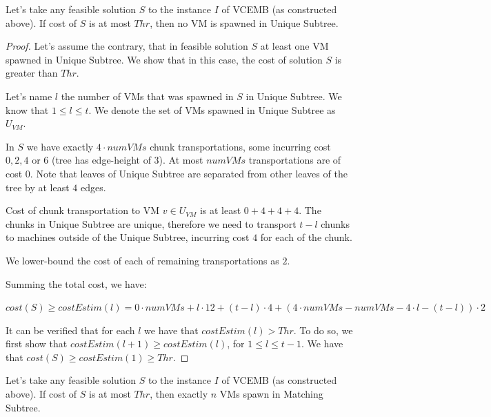 \begin{theorem}
  Let's take any feasible solution $S$ to the instance $I$ of VCEMB
  (as constructed above). If cost of $S$ is at most $Thr$, then no VM
  is spawned in Unique Subtree.
  \label{th:no-unique}
\end{theorem}

\begin{proof}
  Let's assume the contrary, that in feasible solution $S$ at least
  one VM spawned in Unique Subtree. We show that in this case, the
  cost of solution $S$ is greater than $Thr$.

  Let's name $l$ the number of VMs that was spawned in $S$ in Unique
  Subtree. We know that $1 \leq l \leq t$. We denote the set of VMs
  spawned in Unique Subtree as $U_{VM}$.

  In $S$ we have exactly $4 \cdot numVMs$ chunk transportations, some
  incurring cost $0, 2, 4$ or $6$ (tree has edge-height of $3$). At
  most $numVMs$ transportations are of cost $0$. Note that leaves of
  Unique Subtree are separated from other leaves of the tree by at
  least $4$ edges.

  Cost of chunk transportation to VM $v \in U_{VM}$ is at least
  $0 + 4 + 4 + 4$. The chunks in Unique Subtree are unique, therefore
  we need to transport $t - l$ chunks to machines outside of the
  Unique Subtree, incurring cost $4$ for each of the chunk.

  We lower-bound the cost of each of remaining transportations as $2$.

  Summing the total cost, we have:

  $cost(S) \geq costEstim(l) = 0 \cdot numVMs + l \cdot 12 +
  (t-l)\cdot 4 + (4\cdot numVMs - numVMs - 4\cdot l - (t-l))\cdot 2$

  It can be verified that for each $l$ we have that
  $costEstim(l) > Thr$. To do so, we first show that
  $costEstim(l+1) \geq costEstim(l)$, for $1\leq l \leq t-1$. We have
  that $cost(S) \geq costEstim(1) \geq Thr$.
\end{proof}

\begin{theorem}
  Let's take any feasible solution $S$ to the instance $I$ of VCEMB
  (as constructed above). If cost of $S$ is at most $Thr$, then
  exactly $n$ VMs spawn in Matching Subtree.
  \label{th:np-balance}
\end{theorem}

